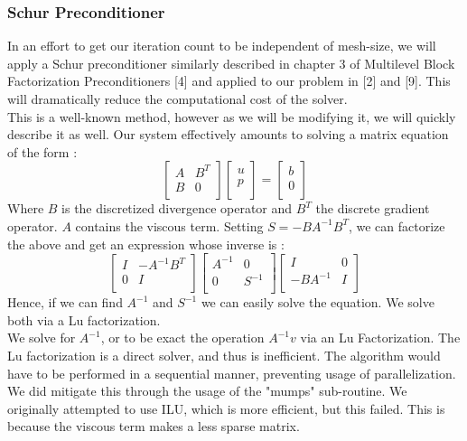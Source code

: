 \documentclass[11pt,twoside,a4paper]{article}
\begin{document}
\subsubsection{Schur Preconditioner}
In an effort to get our iteration count to be independent of mesh-size, we will apply a Schur preconditioner similarly described in chapter 3 of Multilevel Block Factorization Preconditioners [4] and applied to our problem in [2] and [9]. This will dramatically reduce the computational cost of the solver.\\
This is a well-known method, however as we will be modifying it, we will quickly describe it as well.
Our system effectively amounts to solving a matrix equation of the form :
$$
\begin{bmatrix}
A         & B^{T}\\
B         & 0 \\
\end{bmatrix}
\begin{bmatrix}
u    \\
p     \\
\end{bmatrix}
=
\begin{bmatrix}
b    \\
0     \\
\end{bmatrix}
$$
Where $B$ is the discretized divergence operator and $B^T$ the discrete gradient operator. $A$ contains the viscous term.
Setting $S = - B A^{-1} B^{T}$, we can factorize the above and get an expression whose inverse is :
$$
\begin{bmatrix}
I         & - A^{-1} B^{T}\\
0         & I \\
\end{bmatrix}
\begin{bmatrix}
A^{-1}   & 0\\
0       & S^{-1} \\
\end{bmatrix}
\begin{bmatrix}
I & 0\\
 - B A^{-1}       & I \\
\end{bmatrix}
$$
Hence, if we can find $A^{-1}$ and $S^{-1}$ we can easily solve the equation. We solve both via a Lu factorization.\\
We solve for $A^{-1}$, or to be exact the operation $A^{-1}v$ via an Lu Factorization. The Lu factorization is a direct solver, and thus is inefficient. The algorithm would have to be performed in a sequential manner, preventing usage of parallelization. We did mitigate this through the usage of the "mumps" sub-routine. We originally attempted to use ILU, which is more efficient, but this failed. This is because the viscous term makes a less sparse matrix.\\
\end{document}
